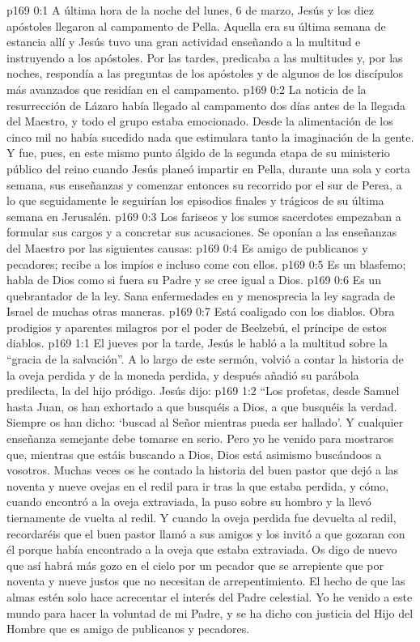 \author{Comisión de seres intermedios}
\vs p169 0:1 A última hora de la noche del lunes, 6 de marzo, Jesús y los diez apóstoles llegaron al campamento de Pella. Aquella era su última semana de estancia allí y Jesús tuvo una gran actividad enseñando a la multitud e instruyendo a los apóstoles. Por las tardes, predicaba a las multitudes y, por las noches, respondía a las preguntas de los apóstoles y de algunos de los discípulos más avanzados que residían en el campamento.
\vs p169 0:2 La noticia de la resurrección de Lázaro había llegado al campamento dos días antes de la llegada del Maestro, y todo el grupo estaba emocionado. Desde la alimentación de los cinco mil no había sucedido nada que estimulara tanto la imaginación de la gente. Y fue, pues, en este mismo punto álgido de la segunda etapa de su ministerio público del reino cuando Jesús planeó impartir en Pella, durante una sola y corta semana, sus enseñanzas y comenzar entonces su recorrido por el sur de Perea, a lo que seguidamente le seguirían los episodios finales y trágicos de su última semana en Jerusalén.
\vs p169 0:3 \pc Los fariseos y los sumos sacerdotes empezaban a formular sus cargos y a concretar sus acusaciones. Se oponían a las enseñanzas del Maestro por las siguientes causas:
\vs p169 0:4 Es amigo de publicanos y pecadores; recibe a los impíos e incluso come con ellos.
\vs p169 0:5 Es un blasfemo; habla de Dios como si fuera su Padre y se cree igual a Dios.
\vs p169 0:6 Es un quebrantador de la ley. Sana enfermedades en  y menosprecia la ley sagrada de Israel de muchas otras maneras.
\vs p169 0:7 Está coaligado con los diablos. Obra prodigios y aparentes milagros por el poder de Beelzebú, el príncipe de estos diablos.
\vs p169 1:1 El jueves por la tarde, Jesús le habló a la multitud sobre la “gracia de la salvación”. A lo largo de este sermón, volvió a contar la historia de la oveja perdida y de la moneda perdida, y después añadió su parábola predilecta, la del hijo pródigo. Jesús dijo:
\vs p169 1:2 \pc “Los profetas, desde Samuel hasta Juan, os han exhortado a que busquéis a Dios, a que busquéis la verdad. Siempre os han dicho: ‘buscad al Señor mientras pueda ser hallado’. Y cualquier enseñanza semejante debe tomarse en serio. Pero yo he venido para mostraros que, mientras que estáis buscando a Dios, Dios está asimismo buscándoos a vosotros. Muchas veces os he contado la historia del buen pastor que dejó a las noventa y nueve ovejas en el redil para ir tras la que estaba perdida, y cómo, cuando encontró a la oveja extraviada, la puso sobre su hombro y la llevó tiernamente de vuelta al redil. Y cuando la oveja perdida fue devuelta al redil, recordaréis que el buen pastor llamó a sus amigos y los invitó a que gozaran con él porque había encontrado a la oveja que estaba extraviada. Os digo de nuevo que así habrá más gozo en el cielo por un pecador que se arrepiente que por noventa y nueve justos que no necesitan de arrepentimiento. El hecho de que las almas estén  solo hace acrecentar el interés del Padre celestial. Yo he venido a este mundo para hacer la voluntad de mi Padre, y se ha dicho con justicia del Hijo del Hombre que es amigo de publicanos y pecadores.
